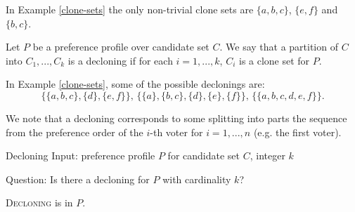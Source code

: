 \begin{exmp}
In Example \ref{clone-sets} the only non-trivial clone sets are
$\{a,b,c\}$, $\{e,f\}$ and $\{b,c\}$.
\end{exmp}

\begin{defn}[decloning]
Let $P$ be a preference profile over candidate set $C$.
We say that a partition of $C$ into $C_1, ..., C_k$ is a decloning
if for each $i=1,...,k$, $C_i$ is a clone set for $P$.
\end{defn}

\begin{exmp}
In Example \ref{clone-sets}, some of the possible declonings are:
$$
\big\{ \{a,b,c\}, \{d\}, \{e,f\} \big\} \text{, }
\big\{ \{a\}, \{b,c\}, \{d\}, \{e\}, \{f\} \big\} \text{, }
\big\{ \{a,b,c,d,e,f\} \big\} \text{.}
$$
\end{exmp}

\begin{rmrk} \label{sequence-split}
We note that a decloning corresponds to some splitting into parts
the sequence from the preference order of the $i$-th voter for $i=1,...,n$ (e.g. the first voter).
\end{rmrk}


\begin{problem}{Decloning}
    Input: preference profile $P$ for candidate set $C$, integer $k$

    Question: Is there a decloning for $P$ with cardinality $k$?
\end{problem}

\begin{thm}
\textsc{Decloning} is in $P$.
\end{thm}


